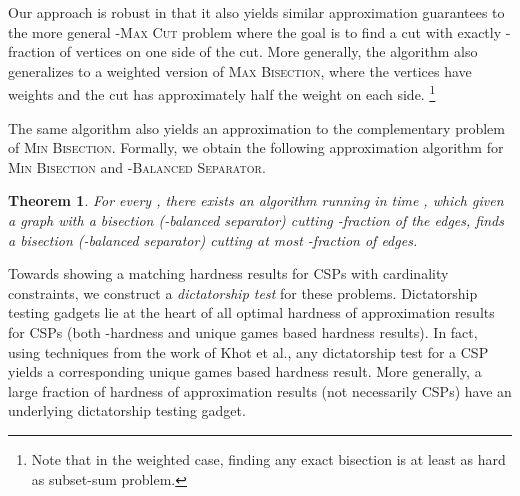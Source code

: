 \documentclass[11pt]{article}
\newtheorem{theorem}{Theorem}[section]
\theoremstyle{definition}
\newcommand{\etal}{et al.\xspace}
\newcommand{\problemmacro}[1]{\texorpdfstring{\textsc{#1}}{#1}\xspace}
\newcommand{\maxcut}{\problemmacro{Max Cut}}
\newcommand{\balancedseparator}{\problemmacro{Balanced Separator}}
\newcommand{\minbisection}{\problemmacro{Min Bisection}}
\newcommand{\maxbisection}{\problemmacro{Max Bisection}}
\numberwithin{equation}{section}
\begin{document}
Our approach is robust in that it also yields similar
approximation guarantees to the more general -\maxcut problem
where the goal is to find a cut with exactly -fraction of
vertices on one side of the cut.  More generally, the algorithm also
generalizes to a weighted version of \maxbisection, where the vertices
have weights and the cut has approximately half the weight on each
side.  \footnote{Note that in the weighted case, finding any exact bisection is at least as
hard as subset-sum problem.}

The same algorithm also yields an approximation to the complementary
problem of \minbisection.  Formally, we obtain the following
approximation algorithm for \minbisection and
-\balancedseparator.

\begin{theorem} \label{thm:minbisection}
For every , there exists an algorithm running in time
, which given a graph with a bisection (-balanced separator) cutting
-fraction of the edges, finds a bisection (-balanced separator) cutting at most
-fraction of edges.
\end{theorem}

Towards showing a matching hardness results for CSPs with cardinality
constraints, we construct a {\it dictatorship test} for these
problems.  Dictatorship testing gadgets lie at the heart of all
optimal hardness of approximation results for CSPs (both
-hardness and unique games based hardness results).  In fact,
using techniques from the work of Khot \etal \cite{KhotKMO07}, any
dictatorship test for a CSP yields a corresponding unique games based
hardness result.  More generally, a large fraction of hardness of
approximation results (not necessarily CSPs) have an underlying
dictatorship testing gadget.
\end{document}
